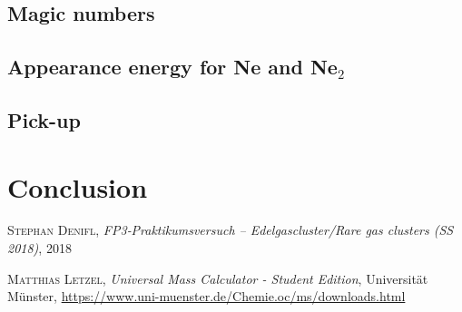\documentclass[a4paper,10pt]{article}
\begin{document}
\subsection{Magic numbers}
\subsection{Appearance energy for Ne and Ne$_2$}
\subsection{Pick-up}
\section{Conclusion}

\begin{thebibliography}{99}
\textsc{Stephan Denifl}, \textit{FP3‐Praktikumsversuch – Edelgascluster/Rare gas clusters (SS 2018)}, 2018

\textsc{Matthias Letzel}, \textit{Universal Mass Calculator - Student Edition}, Universität Münster, \url{https://www.uni-muenster.de/Chemie.oc/ms/downloads.html}

\end{thebibliography}
\end{document}

